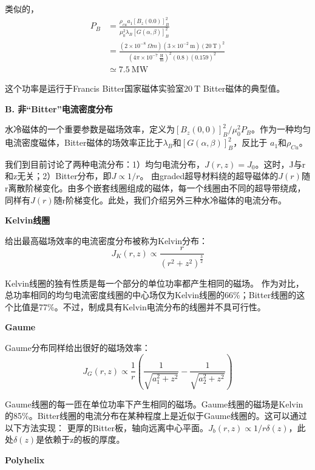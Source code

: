 类似的，
\begin{equation}
\begin{split}
P_B&=\frac{\rho_{cu}a_1[B_z(0.0)]_B^2}{\mu_0^2\lambda_B[G(\alpha,\beta)]_B^2}\\
&=\frac{(2\times 10^{-8}\ \Omega m)(3\times 10^{-2}\ \mathrm{m})(20\ \mathrm{T})^2}{(4\pi\times 10^{-7}\ \mathrm{\frac{H}{m}})^2(0.8)(0.159)^2}\\
&\simeq 7.5\ \mathrm{MW}%
\end{split}
\end{equation}

这个功率是运行于Francis Bitter国家磁体实验室$20\ \mathrm{T}$ Bitter磁体的典型值。

\textbf{B. 非“Bitter”电流密度分布}

水冷磁体的一个重要参数是磁场效率，定义为$[B_z(0,0)]_B^2/\mu_0^2 P_B$。作为一种均匀电流密度磁体，Bitter磁体的场效率正比于$\lambda_B$和$[G(\alpha,\beta)]_B^2$，反比于
$a_1$和$\rho_{Cu}$。

我们到目前讨论了两种电流分布：1）均匀电流分布，$J(r,z)=J_0$。这时，J与r和z无关；2）Bitter分布，即$J\propto 1/r$。
由graded超导材料绕的超导磁体的$J(r)$随r离散阶梯变化。由多个嵌套线圈组成的磁体，每一个线圈由不同的超导带绕成，同样有$J(r)$随r阶梯变化。此处，我们介绍另外三种水冷磁体的电流分布。

\textbf{Kelvin线圈}

给出最高磁场效率的电流密度分布被称为Kelvin分布：
\begin{equation}
J_K(r,z)\propto\frac{r}{(r^2+z^2)^\frac{3}{2}}%
\end{equation}

Kelvin线圈的独有性质是每一个部分的单位功率都产生相同的磁场。
作为对比，总功率相同的均匀电流密度线圈的中心场仅为Kelvin线圈的66\%；Bitter线圈的这个比值是77\%。不过，制成具有Kelvin电流分布的线圈并不具可行性。

\textbf{Gaume}

Gaume分布同样给出很好的磁场效率：
\begin{equation}
J_G(r,z)\propto\frac{1}{r}\left(\frac{1}{\sqrt{a_1^2+z^2}}-\frac{1}{\sqrt{a_2^2+z^2}}\right)%
\end{equation}

Gaume线圈的每一匝在单位功率下产生相同的磁场。Gaume线圈的磁场是Kelvin的85\%。Bitter线圈的电流分布在某种程度上是近似于Gaume线圈的。这可以通过以下方法实现：
更厚的Bitter板，轴向远离中心平面。$J_b(r,z)\propto 1/r\delta(z)$，此处$\delta(z)$是依赖于z的板的厚度。

\textbf{Polyhelix}


